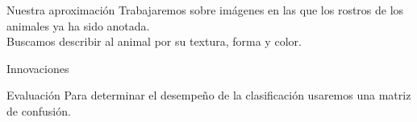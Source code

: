 \documentclass{beamer}
\begin{document}
	\begin{frame}{Nuestra aproximación}
		Trabajaremos sobre imágenes en las que los rostros de los animales ya ha sido anotada.\\
		Buscamos describir al animal por su textura, forma y color.
	\end{frame}
	\begin{frame}{Innovaciones}
	\end{frame}
	\begin{frame}{Evaluación}
		Para determinar el desempeño de la clasificación usaremos una matriz de confusión.
	\end{frame}

\end{document}
